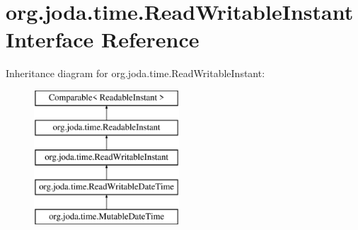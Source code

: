 \hypertarget{interfaceorg_1_1joda_1_1time_1_1_read_writable_instant}{\section{org.\-joda.\-time.\-Read\-Writable\-Instant Interface Reference}
\label{interfaceorg_1_1joda_1_1time_1_1_read_writable_instant}
}
Inheritance diagram for org.\-joda.\-time.\-Read\-Writable\-Instant\-:\begin{figure}[H]
\begin{center}
\leavevmode
\includegraphics[height=5.000000cm]{interfaceorg_1_1joda_1_1time_1_1_read_writable_instant}
\end{center}
\end{figure}
